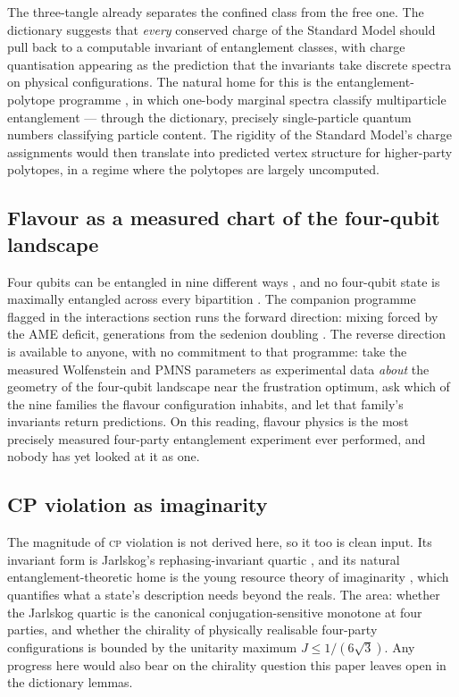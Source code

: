 The three-tangle already separates the confined class from the free one. The dictionary
suggests that \emph{every} conserved charge of the Standard Model should pull back to a
computable invariant of entanglement classes, with charge quantisation appearing as the
prediction that the invariants take discrete spectra on physical configurations. The
natural home for this is the entanglement-polytope programme
\autocite{klyachko2006marginal, walter2013polytopes}, in which one-body marginal spectra
classify multiparticle entanglement --- through the dictionary, precisely single-particle
quantum numbers classifying particle content. The rigidity of the Standard Model's
charge assignments would then translate into predicted vertex structure for higher-party
polytopes, in a regime where the polytopes are largely uncomputed.

\subsection{Flavour as a measured chart of the four-qubit landscape}
\label{app:rev-flavour}

Four qubits can be entangled in nine different ways \autocite{verstraete2002four}, and
no four-qubit state is maximally entangled across every bipartition
\autocite{higuchisudbery2000, hubersiewert2026}. The companion programme flagged in the
interactions section runs the forward direction: mixing forced by the AME deficit,
generations from the sedenion doubling \autocite{gillardgresnigt2019three}. The reverse
direction is available to anyone, with no commitment to that programme: take the
measured Wolfenstein and PMNS parameters as experimental data \emph{about} the geometry
of the four-qubit landscape near the frustration optimum, ask which of the nine families
the flavour configuration inhabits, and let that family's invariants return predictions.
On this reading, flavour physics is the most precisely measured four-party entanglement
experiment ever performed, and nobody has yet looked at it as one.

\subsection{CP violation as imaginarity}
\label{app:rev-cp}

The magnitude of \textsc{cp} violation is not derived here, so it too is clean input.
Its invariant form is Jarlskog's rephasing-invariant quartic
\autocite{jarlskog1985commutator}, and its natural entanglement-theoretic home is the
young resource theory of imaginarity \autocite{hickeygour2018imaginarity,
wu2021imaginarity}, which quantifies what a state's description needs beyond the reals.
The area: whether the Jarlskog quartic is the canonical conjugation-sensitive monotone
at four parties, and whether the chirality of physically realisable four-party
configurations is bounded by the unitarity maximum $J \leq 1/(6\sqrt{3})$. Any progress
here would also bear on the chirality question this paper leaves open in the dictionary
lemmas.


